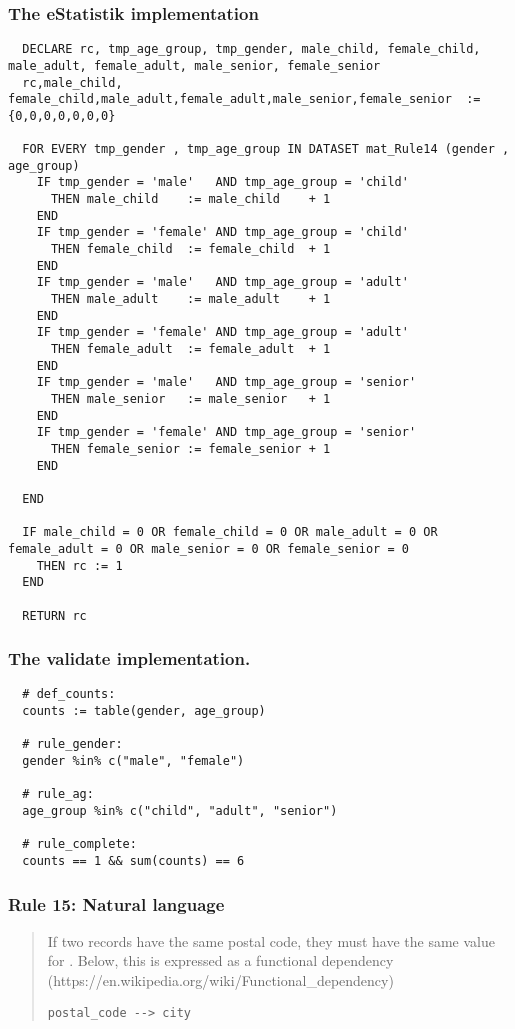 \subsubsection*{The eStatistik implementation}
\begin{verbatim}
  DECLARE rc, tmp_age_group, tmp_gender, male_child, female_child, male_adult, female_adult, male_senior, female_senior
  rc,male_child, female_child,male_adult,female_adult,male_senior,female_senior  := {0,0,0,0,0,0,0}

  FOR EVERY tmp_gender , tmp_age_group IN DATASET mat_Rule14 (gender , age_group)
    IF tmp_gender = 'male'   AND tmp_age_group = 'child'
      THEN male_child    := male_child    + 1
    END
    IF tmp_gender = 'female' AND tmp_age_group = 'child'   
      THEN female_child  := female_child  + 1
    END
    IF tmp_gender = 'male'   AND tmp_age_group = 'adult'  
      THEN male_adult    := male_adult    + 1
    END
    IF tmp_gender = 'female' AND tmp_age_group = 'adult'  
      THEN female_adult  := female_adult  + 1
    END
    IF tmp_gender = 'male'   AND tmp_age_group = 'senior' 
      THEN male_senior   := male_senior   + 1
    END
    IF tmp_gender = 'female' AND tmp_age_group = 'senior' 
      THEN female_senior := female_senior + 1
    END

  END
  
  IF male_child = 0 OR female_child = 0 OR male_adult = 0 OR female_adult = 0 OR male_senior = 0 OR female_senior = 0 
    THEN rc := 1
  END

  RETURN rc
\end{verbatim}
\subsubsection*{The validate implementation.}
\begin{verbatim}
  # def_counts:
  counts := table(gender, age_group)

  # rule_gender:
  gender %in% c("male", "female")

  # rule_ag:
  age_group %in% c("child", "adult", "senior")

  # rule_complete:
  counts == 1 && sum(counts) == 6
\end{verbatim}


\newpage

\subsubsection*{  Rule 15: Natural language}
\begin{quote}


If two records have the same postal code, they must have the same value for . Below, this is expressed
as a functional dependency (https://en.wikipedia.org/wiki/Functional\_dependency)

\begin{verbatim}
postal_code --> city
\end{verbatim}



\end{quote}
